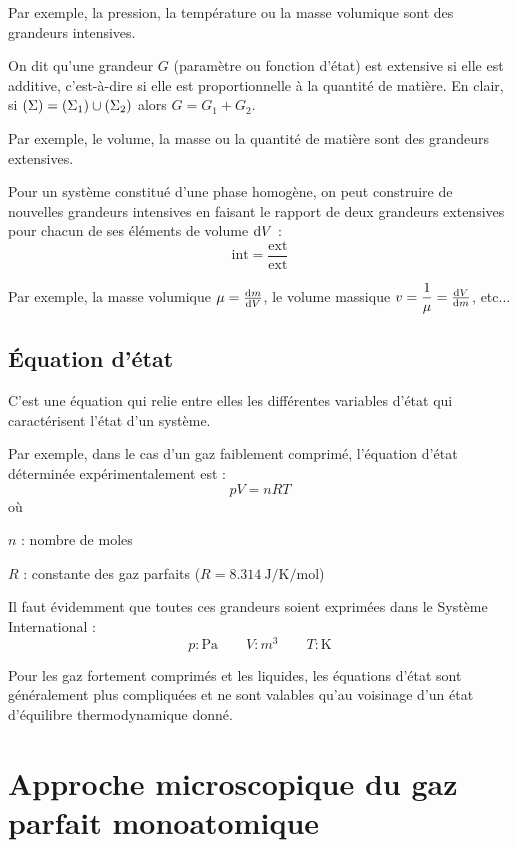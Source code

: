 Par exemple, la pression, la température ou la masse volumique sont des grandeurs intensives.

On dit qu'une grandeur \(G\) (paramètre ou fonction d'état) est extensive si elle est additive, c'est-à-dire si elle est proportionnelle à la quantité de matière. En clair, si \(\left(\Sigma\right)=\left(\Sigma_1\right)\cup\left(\Sigma_2\right)\) alors \(G=G_1+G_2\).

Par exemple, le volume, la masse ou la quantité de matière sont des grandeurs extensives.

Pour un système constitué d'une phase homogène, on peut construire de nouvelles grandeurs intensives en faisant le rapport de deux grandeurs extensives pour chacun de ses éléments de volume \(\odif{V}\) : \[\text{int}=\dfrac{\text{ext}}{\text{ext}}\]

Par exemple, la masse volumique \(\mu=\odv{m}{V}\), le volume massique \(v=\dfrac{1}{\mu}=\odv{V}{m}\), etc...

\subsection{Équation d'état}

C'est une équation qui relie entre elles les différentes variables d'état qui caractérisent l'état d'un système.

Par exemple, dans le cas d'un gaz faiblement comprimé, l'équation d'état déterminée expérimentalement est : \[pV=nRT\] où \begin{description}
\item \(n\) : nombre de moles

\item \(R\) : constante des gaz parfaits (\(R=\SI{8.314}{\joule\per\kelvin\per\mole}\))\\
\end{description}

Il faut évidemment que toutes ces grandeurs soient exprimées dans le Système International : \[p:\unit{\pascal}\qquad V:\unit{m^3}\qquad T:\unit{\kelvin}\]

Pour les gaz fortement comprimés et les liquides, les équations d'état sont généralement plus compliquées et ne sont valables qu'au voisinage d'un état d'équilibre thermodynamique donné.

\section{Approche microscopique du gaz parfait monoatomique}

